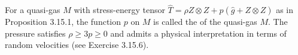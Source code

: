 For a quasi-gas $M$ with stress-energy tensor $\hat{T} = \rho Z \otimes Z + p(\hat{g} + Z \otimes Z)$ as in Proposition 3.15.1, the function $p$ on $M$ is called the  of the quasi-gas $M$. The pressure satisfies $\rho \geq 3p \geq 0$ and admits a physical interpretation in terms of random velocities (see Exercise 3.15.6).
